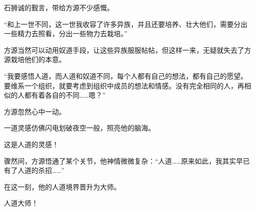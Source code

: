 \begin{this_body}
石狮诚的觐言，带给方源不少感慨。

“和上一世不同，这一世我收容了许多异族，并且还要培养、壮大他们，需要分出一些精力去照看，分出一些物力去栽培。”

方源当然可以动用奴道手段，让这些异族服服帖帖，但这样一来，无疑就失去了方源栽培他们的本意。

“我要感悟人道，而人道和奴道不同，每个人都有自己的想法，都有自己的愿望。要维系一个组织，就要考虑到组织中成员的想法和情感。没有完全相同的人，再相似的人都有着各自的不同……嗯？”

方源忽然心中一动。

一道灵感仿佛闪电划破夜空一般，照亮他的脑海。

这是人道的灵感！

骤然间，方源悟通了某个关节，他神情微微复杂：“人道……原来如此，我其实早已有了人道的杀招……”

在这一刻，他的人道境界晋升为大师。

人道大师！

\end{this_body}


